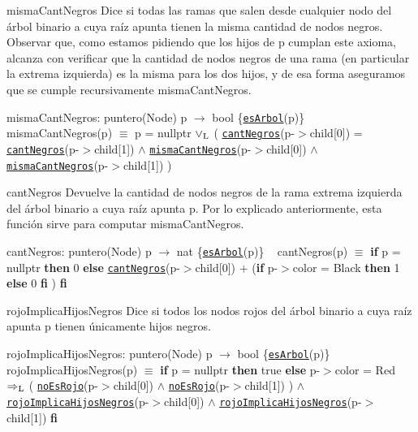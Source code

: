 \begin{DoxyParagraph}{misma\+Cant\+Negros}
Dice si todas las ramas que salen desde cualquier nodo del árbol binario a cuya raíz apunta tienen la misma cantidad de nodos negros. Observar que, como estamos pidiendo que los hijos de p cumplan este axioma, alcanza con verificar que la cantidad de nodos negros de una rama (en particular la extrema izquierda) es la misma para los dos hijos, y de esa forma aseguramos que se cumple recursivamente misma\+Cant\+Negros.

misma\+Cant\+Negros\+: puntero(\+Node) p $\to$ bool \{\href{axiomas.html#esArbol}{\tt es\+Arbol}(p)\} ~\newline
misma\+Cant\+Negros(p) $\equiv$ p = nullptr $\lor_{\rm L}$ ( \href{axiomas.html#cantNegros}{\tt cant\+Negros}(p-\/$>$child\mbox{[}0\mbox{]}) = \href{axiomas.html#cantNegros}{\tt cant\+Negros}(p-\/$>$child\mbox{[}1\mbox{]}) $\land$ \href{axiomas.html#mismaCantNegros}{\tt misma\+Cant\+Negros}(p-\/$>$child\mbox{[}0\mbox{]}) $\land$ \href{axiomas.html#mismaCantNegros}{\tt misma\+Cant\+Negros}(p-\/$>$child\mbox{[}1\mbox{]}) )


\end{DoxyParagraph}
\begin{DoxyParagraph}{cant\+Negros}
Devuelve la cantidad de nodos negros de la rama extrema izquierda del árbol binario a cuya raíz apunta p. Por lo explicado anteriormente, esta función sirve para computar misma\+Cant\+Negros.

cant\+Negros\+: puntero(\+Node) p $\to$ nat \{\href{axiomas.html#esArbol}{\tt es\+Arbol}(p)\} ~\newline
cant\+Negros(p) $\equiv$ {\bfseries if} p = nullptr {\bfseries then} 0 {\bfseries else} \href{axiomas.html#cantNegros}{\tt cant\+Negros}(p-\/$>$child\mbox{[}0\mbox{]}) $+$ ({\bfseries if} p-\/$>$color = Black {\bfseries then} 1 {\bfseries else} 0 {\bfseries fi} ) {\bfseries fi} 


\end{DoxyParagraph}
\begin{DoxyParagraph}{rojo\+Implica\+Hijos\+Negros}
Dice si todos los nodos rojos del árbol binario a cuya raíz apunta p tienen únicamente hijos negros.

rojo\+Implica\+Hijos\+Negros\+: puntero(\+Node) p $\to$ bool \{\href{axiomas.html#esArbol}{\tt es\+Arbol}(p)\} ~\newline
rojo\+Implica\+Hijos\+Negros(p) $\equiv$ {\bfseries if} p = nullptr {\bfseries then} true {\bfseries else} p-\/$>$color = Red $\Rightarrow_{\rm L}$ ( \href{axiomas.html#noEsRojo}{\tt no\+Es\+Rojo}(p-\/$>$child\mbox{[}0\mbox{]}) $\land$ \href{axiomas.html#noEsRojo}{\tt no\+Es\+Rojo}(p-\/$>$child\mbox{[}1\mbox{]}) ) $\land$ \href{axiomas.html#rojoImplicaHijosNegros}{\tt rojo\+Implica\+Hijos\+Negros}(p-\/$>$child\mbox{[}0\mbox{]}) $\land$ \href{axiomas.html#rojoImplicaHijosNegros}{\tt rojo\+Implica\+Hijos\+Negros}(p-\/$>$child\mbox{[}1\mbox{]}) {\bfseries fi} 


\end{DoxyParagraph}
